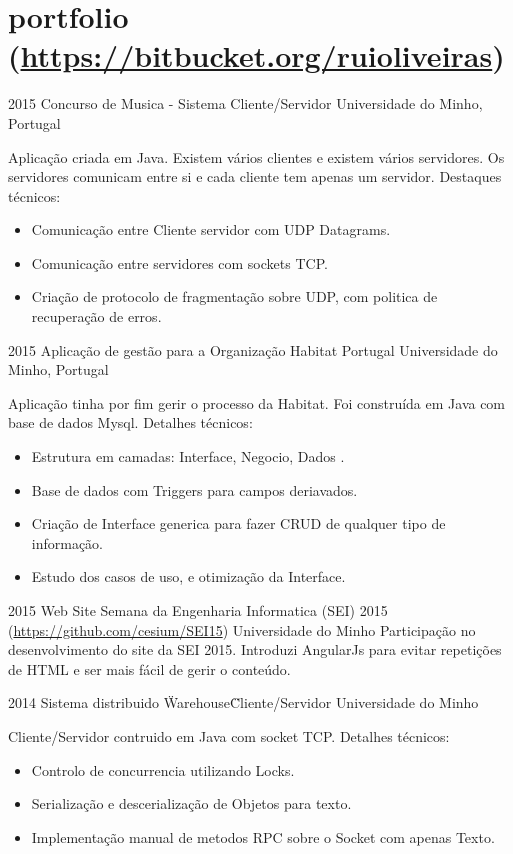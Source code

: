 \documentclass[]{friggeri-cv} %
\begin{document}
\section{portfolio {\normalfont \normalsize (\href{https://bitbucket.org/ruioliveiras}{https://bitbucket.org/ruioliveiras})}}
\begin{entrylist}

\entry
{2015}
{Concurso de Musica - Sistema Cliente/Servidor }
{Universidade do Minho, Portugal}
{
Aplicação criada em Java. Existem vários clientes e existem vários servidores. Os servidores comunicam entre si e cada cliente tem apenas um servidor.
Destaques técnicos:
\begin{itemize} 
    \item Comunicação entre Cliente servidor com UDP Datagrams.
    \item Comunicação entre servidores com sockets TCP.
    \item Criação de protocolo de fragmentação sobre UDP, com politica de recuperação de erros.
\end{itemize}
}
\entry
{2015}
{Aplicação de gestão para a Organização Habitat Portugal}
{Universidade do Minho, Portugal}
{
Aplicação tinha por fim gerir o processo da Habitat. Foi construída em Java com base de dados Mysql. Detalhes técnicos:
\begin{itemize} 
    \item Estrutura em camadas: Interface, Negocio, Dados .
    \item Base de dados com Triggers para campos deriavados.
    \item Criação de Interface generica para fazer CRUD de qualquer tipo de informação.
    \item Estudo dos casos de uso, e otimização da Interface.
\end{itemize}
}

\entry
{2015}
{Web Site Semana da Engenharia Informatica (SEI) 2015 \\  {\normalfont \normalsize (\href{https://github.com/cesium/SEI15}{https://github.com/cesium/SEI15})}}
{Universidade do Minho}
{Participação no desenvolvimento do site da SEI 2015. Introduzi AngularJs para evitar repetições de HTML e ser mais fácil de gerir o conteúdo.}

\entry
{2014}
{Sistema distribuido \"Warehouse\" Cliente/Servidor }
{Universidade do Minho}
{Cliente/Servidor contruido em Java com socket TCP. Detalhes técnicos:
\begin{itemize} 
    \item Controlo de concurrencia utilizando Locks.
    \item Serialização e descerialização de Objetos para texto.
    \item Implementação manual de metodos RPC sobre o Socket com apenas Texto.
\end{itemize}
}


\end{entrylist}
\end{document}
